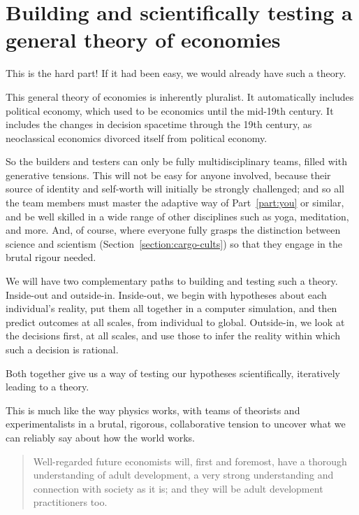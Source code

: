 \section*{Building and scientifically testing a general theory of economies}
This is the hard part! If it had been easy, we would already have such a theory.


This general theory of economies is inherently pluralist.  It automatically includes political economy, which used to be economics until the mid-19th century. It includes the changes in decision spacetime through the 19th century, as neoclassical economics divorced itself from political economy.


So the builders and testers can only be fully multidisciplinary teams, filled with generative tensions. This will not be easy for anyone involved, because their source of identity and self\hyp{}worth will initially be strongly challenged; and so all the team members must master the adaptive way of Part~\ref{part:you} or similar, and be well skilled in a wide range of other disciplines such as yoga, meditation, and more. And, of course, where everyone fully grasps the distinction between science and scientism (Section~\ref{section:cargo-cults}) so that they engage in the brutal rigour needed.


We will have two complementary paths to building and testing such a theory. Inside\hyp{}out and outside\hyp{}in. Inside\hyp{}out, we begin with hypotheses about each individual’s reality, put them all together in a computer simulation, and then predict outcomes at all scales, from individual to global. Outside\hyp{}in, we look at the decisions first, at all scales,  and use those to infer the reality within which such a decision is rational. 


Both together give us a way of testing our hypotheses scientifically, iteratively leading to a theory. 


This is much like the way physics  works, with teams of theorists and experimentalists in a brutal, rigorous, collaborative tension to uncover what we can reliably say about how the world works. 


\begin{quote}
Well\hyp{}regarded future economists will, first and foremost, have a thorough understanding of adult development, a very strong understanding and connection with society as it is; and they will be adult development practitioners too. 
\end{quote}


